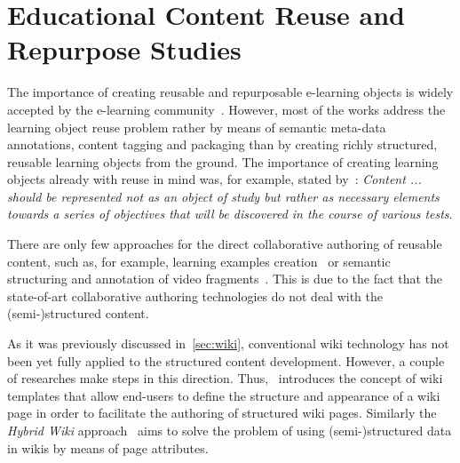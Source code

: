 \documentclass[PhD, Submit, ngerman,UKenglish,table]{scrbook}
\begin{document}
\section{Educational Content Reuse and Repurpose Studies}
\label{sec:state_of_art_reuse}

The importance of creating reusable and repurposable e-learning objects is widely accepted by the e-learning community~\cite{Devedzic:2006:SWE:1177224}.
However, most of the works address the learning object reuse problem rather by means of semantic meta-data annotations, content tagging and packaging than by creating richly structured, reusable learning objects from the ground.
The importance of creating learning objects already with reuse in mind was, for example, stated by~\cite{DBLP:reference/ai/PedreiraSC09}: \emph{Content ... should be represented not as an object of study but rather as necessary elements towards a series of objectives that will be discovered in the course of various tests}.


There are only few approaches for the direct collaborative authoring of reusable content, such as, for example, learning examples creation~\cite{DBLP:conf/iadis/KuoTKHLC08} or semantic structuring and annotation of video fragments~\cite{DBLP:journals/ile/BarriocanalSAL11}.
This is due to the fact that the state-of-art collaborative authoring technologies do not deal with the (semi-)structured content.

As it was previously discussed in~\autoref{sec:wiki}, conventional wiki technology has not been yet fully applied to the structured content development.
However, a couple of researches make steps in this direction.
Thus,~\cite{DBLP:conf/wikis/HaakeLS05} introduces the concept of wiki templates that allow end-users to define the structure and appearance of a wiki page in order to facilitate the authoring of structured wiki pages.
Similarly the \emph{Hybrid Wiki} approach~\cite{DBLP:conf/icsoft/MatthesNS11} aims to solve the problem of using (semi-)structured data in wikis by means of page attributes.
\end{document}
